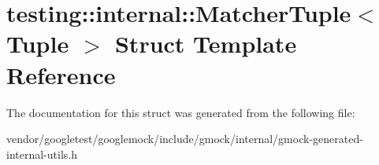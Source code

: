 \hypertarget{structtesting_1_1internal_1_1MatcherTuple}{}\section{testing\+:\+:internal\+:\+:Matcher\+Tuple$<$ Tuple $>$ Struct Template Reference}
\label{structtesting_1_1internal_1_1MatcherTuple}


The documentation for this struct was generated from the following file\+:\begin{DoxyCompactItemize}
\item 
vendor/googletest/googlemock/include/gmock/internal/gmock-\/generated-\/internal-\/utils.\+h\end{DoxyCompactItemize}

